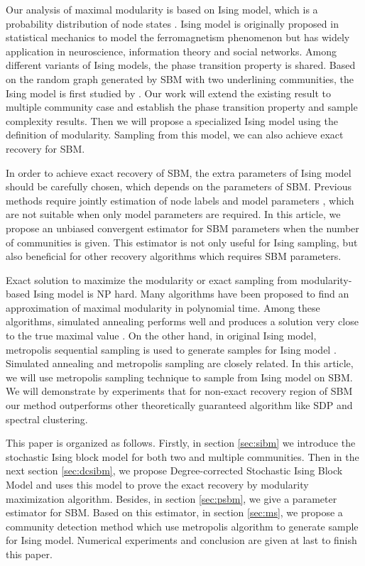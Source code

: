 \documentclass[journal]{IEEEtran}
\begin{document}
Our analysis of maximal modularity is based on Ising model, which is a probability distribution of node states \cite{ising1925beitrag}.
Ising model is originally proposed in statistical mechanics to model the ferromagnetism phenomenon but has widely application in neuroscience, information theory
and social networks. Among different variants of Ising models, the phase transition property is shared. Based on the random graph generated by SBM with two underlining communities,
the Ising model is first studied by \cite{ye2020exact}. Our work will extend the existing result to multiple community case and establish the phase transition
property and sample complexity results. Then we will propose a specialized Ising model using the definition of modularity. Sampling from this model,
we can also achieve exact recovery for SBM.

In order to achieve exact recovery of SBM, the extra parameters of Ising model should be carefully chosen, which depends on the parameters of SBM. 
Previous methods require jointly estimation of node labels and model parameters \cite{nowicki2001estimation}, which are not suitable when only model parameters are required.
In this article, we propose an unbiased convergent estimator for SBM parameters when the number of communities is given. This estimator is not only useful
for Ising sampling, but also beneficial for other recovery algorithms which requires SBM parameters.

Exact solution to maximize the modularity or exact sampling from modularity-based Ising model is NP hard. Many algorithms have been proposed to find an approximation of maximal modularity in polynomial time.
Among these algorithms, simulated annealing performs well and produces a solution very close to the true maximal value \cite{liu2010detecting}.
On the other hand, in original Ising model,
metropolis sequential sampling is used to generate samples for Ising model \cite{metropolis1953equation}. Simulated annealing and metropolis sampling are closely related. In this article, we will
use metropolis sampling technique to sample from Ising model on SBM. We will demonstrate by experiments that for non-exact recovery region of SBM our method outperforms other
theoretically guaranteed algorithm like SDP and spectral clustering.

This paper is organized as follows. Firstly, in section \ref{sec:sibm} we introduce the stochastic Ising block model for both two and multiple communities.
Then in the next section \ref{sec:dcsibm}, we propose Degree-corrected Stochastic Ising Block Model and uses this model to prove the exact recovery by modularity
maximization algorithm. Besides, in section \ref{sec:psbm}, we give a parameter estimator for SBM. Based on this estimator, in section \ref{sec:ms},
we propose a community detection method which use metropolis algorithm to generate sample for Ising model. Numerical experiments and conclusion are given at last
to finish this paper.
\end{document}
